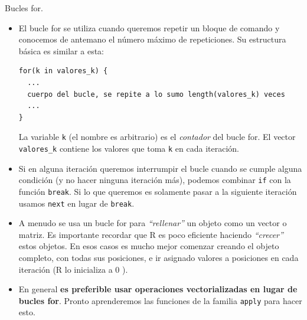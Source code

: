 \documentclass[
  9pt,
  ignorenonframetext,
]{beamer}
\begin{document}
\begin{frame}[fragile]{Bucles for.}
\protect\hypertarget{bucles-for.}{}

\begin{itemize}
\item
  El bucle for se utiliza cuando queremos repetir un bloque de comando y
  conocemos de antemano el número máximo de repeticiones. Su estructura
  básica es similar a esta:\small

\begin{verbatim}
for(k in valores_k) {
  ...
  cuerpo del bucle, se repite a lo sumo length(valores_k) veces
  ...
}
\end{verbatim}

  \normalsize La variable \texttt{k} (el nombre es arbitrario) es el
  \emph{contador} del bucle for. El vector \texttt{valores\_k} contiene
  los valores que toma \texttt{k} en cada iteración.
\item
  Si en alguna iteración queremos interrumpir el bucle cuando se cumple
  alguna condición (y no hacer ninguna iteración más), podemos combinar
  \texttt{if} con la función \texttt{break}. Si lo que queremos es
  solamente pasar a la siguiente iteración usamos \texttt{next} en lugar
  de \texttt{break}.
\item
  A menudo se usa un bucle for para \emph{``rellenar''} un objeto como
  un vector o matriz. Es importante recordar que R es poco eficiente
  haciendo \emph{``crecer''} estos objetos. En esos casos es mucho mejor
  comenzar creando el objeto completo, con todas sus posiciones, e ir
  asignado valores a posiciones en cada iteración (R lo inicializa a 0
  ).
\item
  En general \textbf{es preferible usar operaciones vectorializadas en
  lugar de bucles for}. Pronto aprenderemos las funciones de la familia
  \texttt{apply} para hacer esto.
\end{itemize}

\end{frame}
\end{document}
